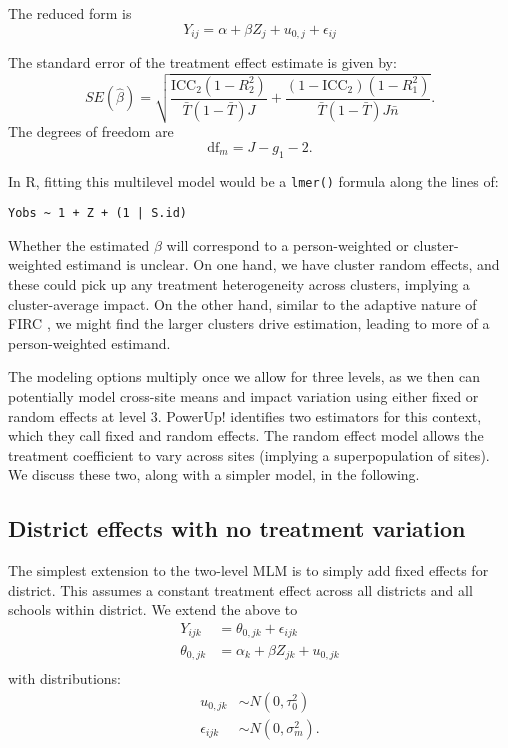 \documentclass[12pt]{article}
\begin{document}
The reduced form is
\[
Y_{ij} = \alpha  + \beta Z_{j} + u_{0,j} + \epsilon_{ij}
\]

The standard error of the treatment effect estimate is given by: \[
SE( \hat{\beta} ) = \sqrt{\frac{\text{ICC}_{2}(1 - R^2_{2})}{\bar{T}(1 - \bar{T}) J} + \frac{(1-\text{ICC}_{2})(1-R^2_{1})}{\bar{T}(1 - \bar{T}) J \bar{n}}}.
\] The degrees of freedom are \[
\text{df}_m = J - g_{1} - 2.
\]

In R, fitting this multilevel model would be a \texttt{lmer()} formula along the lines of:

\begin{verbatim}
Yobs ~ 1 + Z + (1 | S.id)
\end{verbatim}

Whether the estimated $\beta$ will correspond to a person-weighted or cluster-weighted estimand is unclear.
On one hand, we have cluster random effects, and these could pick up any treatment heterogeneity across clusters, implying a cluster-average impact.
On the other hand, similar to the adaptive nature of FIRC \citep{miratrix2021applied}, we might find the larger clusters drive estimation, leading to more of a person-weighted estimand.



The modeling options multiply once we allow for three levels, as we then
can potentially model cross-site means and impact variation using either
fixed or random effects at level 3.
PowerUp! identifies two estimators for this context, which they call fixed and random effects.
The random effect model allows the treatment coefficient to vary across sites (implying a superpopulation of sites). 
We discuss these two, along with a simpler model, in the following.



\subsection{District effects with no treatment variation}

The simplest extension to the two-level MLM is to simply add fixed effects for district.
This assumes a constant treatment effect across all districts and all schools within district.
We extend the above to
\[
\begin{aligned}
Y_{ijk} &=  \theta_{0,jk} + \epsilon_{ijk}\\
\theta_{0,jk} &= \alpha_k + \beta Z_{jk} + u_{0,jk} \\
\end{aligned}
\]
with distributions: \[
\begin{aligned}
u_{0,jk} &\sim N\left(0, \tau^2_{0}\right)\\
\epsilon_{ijk} &\sim N\left(0, \sigma^2_m\right).
\end{aligned}
\]
\end{document}

